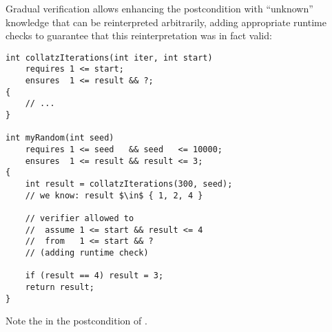 Gradual verification allows enhancing the postcondition with “unknown” knowledge that can be reinterpreted arbitrarily, adding appropriate runtime checks to guarantee that this reinterpretation was in fact valid:
\begin{lstlisting}
int collatzIterations(int iter, int start)
    requires 1 <= start;
    ensures  1 <= result && ?;
{
    // ...
}

int myRandom(int seed)
    requires 1 <= seed   && seed   <= 10000;
    ensures  1 <= result && result <= 3;
{
    int result = collatzIterations(300, seed);
    // we know: result $\in$ { 1, 2, 4 }
    
    // verifier allowed to
    //  assume 1 <= start && result <= 4
    //  from   1 <= start && ?
    // (adding runtime check)
    
    if (result == 4) result = 3;
    return result;
}
\end{lstlisting}
Note the  in the postcondition of .



% 



